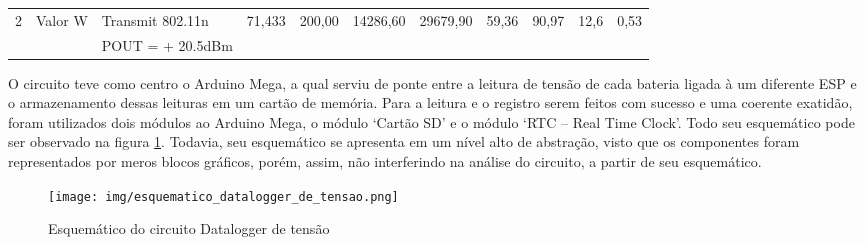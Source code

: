 \begin{table}[htp]
\begin{tabular}{lllllllllll}
\multicolumn{1}{|c|}{\multirow{-3}{*}{2}}                         & \multicolumn{1}{l|}{Valor W}                         & \multicolumn{1}{l|}{Transmit 802.11n}                         & \multicolumn{1}{l|}{71,433}                         & \multicolumn{1}{l|}{200,00}                         & \multicolumn{1}{l|}{14286,60}                        & \multicolumn{1}{l|}{\multirow{-3}{*}{29679,90}}                        & \multicolumn{1}{l|}{\multirow{-3}{*}{59,36}}                         & \multicolumn{1}{l|}{\multirow{-3}{*}{90,97}}                           & \multicolumn{1}{l|}{\multirow{-3}{*}{12,6}}                         & \multicolumn{1}{l|}{\multirow{-3}{*}{0,53}}                         \\
\multicolumn{1}{|l|}{}                                            & \multicolumn{1}{l|}{}                                & \multicolumn{1}{l|}{POUT = + 20.5dBm}                         & \multicolumn{1}{l|}{}                               & \multicolumn{1}{l|}{}                               & \multicolumn{1}{l|}{}                                & \multicolumn{1}{l|}{}                                                  & \multicolumn{1}{l|}{}                                                & \multicolumn{1}{l|}{}                                                  & \multicolumn{1}{l|}{}                                               & \multicolumn{1}{l|}{}                                               \\ \hline
\end{tabular}
\end{table}


{
O circuito teve como centro o Arduino Mega, a qual serviu de ponte entre a leitura de tensão de cada bateria ligada à um diferente ESP e o armazenamento dessas leituras em um cartão de memória. Para a leitura e o registro serem feitos com sucesso e uma coerente exatidão, foram utilizados dois módulos ao Arduino Mega, o módulo ‘Cartão SD’ e o módulo ‘RTC – Real Time Clock’. Todo seu esquemático pode ser observado na figura \ref{fig:esquematico_datalogger_de_tensao}. Todavia, seu esquemático se apresenta em um nível alto de abstração, visto que os componentes foram representados por meros blocos gráficos, porém, assim, não interferindo na análise do circuito, a partir de seu esquemático.
}

\begin{figure}[H]
    \centering
    \texttt{[image: img/esquematico\_datalogger\_de\_tensao.png]}
    \caption{Esquemático do circuito Datalogger de tensão}
    \label{fig:esquematico_datalogger_de_tensao}
\end{figure}

